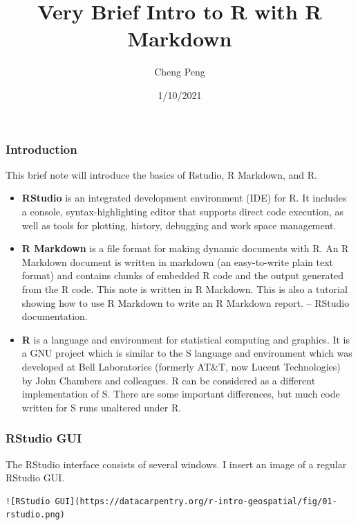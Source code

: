\documentclass[
]{article}
\title{Very Brief Intro to R with R Markdown}
\author{Cheng Peng}
\date{1/10/2021}
\begin{document}
\maketitle

{
\setcounter{tocdepth}{4}
\tableofcontents
}
\hypertarget{introduction}{%
\subsubsection{Introduction}\label{introduction}}

This brief note will introduce the basics of Rstudio, R Markdown, and R.

\begin{itemize}
\item
  \textbf{RStudio} is an integrated development environment (IDE) for R.
  It includes a console, syntax-highlighting editor that supports direct
  code execution, as well as tools for plotting, history, debugging and
  work space management.
\item
  \textbf{R Markdown} is a file format for making dynamic documents with
  R. An R Markdown document is written in markdown (an easy-to-write
  plain text format) and contains chunks of embedded R code and the
  output generated from the R code. This note is written in R Markdown.
  This is also a tutorial showing how to use R Markdown to write an R
  Markdown report. -- RStudio documentation.
\item
  \textbf{R} is a language and environment for statistical computing and
  graphics. It is a GNU project which is similar to the S language and
  environment which was developed at Bell Laboratories (formerly AT\&T,
  now Lucent Technologies) by John Chambers and colleagues. R can be
  considered as a different implementation of S. There are some
  important differences, but much code written for S runs unaltered
  under R.
\end{itemize}

\hypertarget{rstudio-gui}{%
\subsubsection{RStudio GUI}\label{rstudio-gui}}

The RStudio interface consists of several windows. I insert an image of
a regular RStudio GUI.

\begin{verbatim}
![RStudio GUI](https://datacarpentry.org/r-intro-geospatial/fig/01-rstudio.png)
\end{verbatim}
\end{document}
